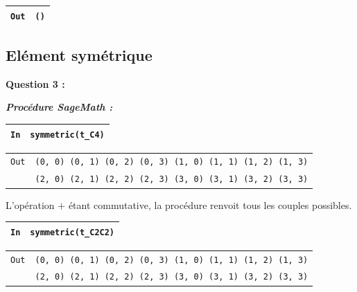 \documentclass[titlepage]{article}
\begin{document}
        \begin{tabularx}{11.5cm}{|p{0.60cm}|X|}
            \hline
            \verb|Out|
            & 
            \verb|()|
            \\
            \hline
        \end{tabularx}

        \pagebreak
        \subsection{Elément symétrique}
        \textbf{Question 3 :}

        \emph{\textbf{Procédure SageMath :}}

        

        \begin{tabularx}{11.5cm}{|p{0.60cm}|X|}
            \hline
            \verb|In|
            & 
            \verb|symmetric(t_C4)|
            \\
            \hline
        \end{tabularx}

        \begin{tabularx}{11.5cm}{|p{0.60cm}|X|}
            \hline
            \verb|Out|
            & 
            \verb|(0, 0) (0, 1) (0, 2) (0, 3) (1, 0) (1, 1) (1, 2) (1, 3)|
            \\
            \verb||
            &
            \verb|(2, 0) (2, 1) (2, 2) (2, 3) (3, 0) (3, 1) (3, 2) (3, 3)|
            \\
            \hline
        \end{tabularx}\newline
        
        L'opération $+$ étant commutative, la procédure renvoit tous les couples possibles.\newline

        \begin{tabularx}{11.5cm}{|p{0.60cm}|X|}
            \hline
            \verb|In|
            & 
            \verb|symmetric(t_C2C2)|
            \\
            \hline
        \end{tabularx}

        \begin{tabularx}{11.5cm}{|p{0.60cm}|X|}
            \hline
            \verb|Out|
            & 
            \verb|(0, 0) (0, 1) (0, 2) (0, 3) (1, 0) (1, 1) (1, 2) (1, 3)|
            \\
            \verb||
            &
            \verb|(2, 0) (2, 1) (2, 2) (2, 3) (3, 0) (3, 1) (3, 2) (3, 3)|
            \\
            \hline
        \end{tabularx}\newline
        
\end{document}
